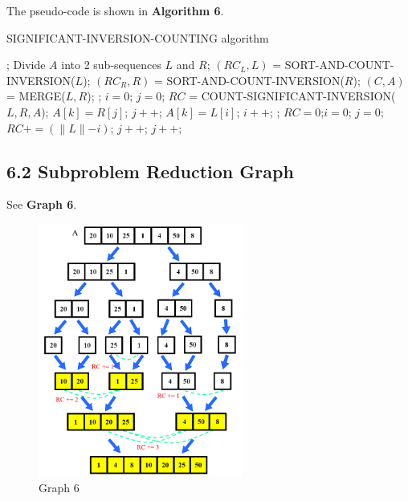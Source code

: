 \documentclass[UTF8]{ctexart}
\begin{document}
The pseudo-code is shown in \textbf{Algorithm 6}.
\begin{algorithm}[htbp]
	\caption{SIGNIFICANT-INVERSION-COUNTING algorithm}
	\begin{algorithmic}[1]
			\State \Return{};
		\EndIf
		\State Divide $A$ into 2 sub-sequences $L$ and $R$;
		\State $(RC_L, L)$ = SORT-AND-COUNT-INVERSION($L$);
		\State $(RC_R, R)$ = SORT-AND-COUNT-INVERSION($R$);
		\State $(C, A)$ = MERGE($L, R$);
		\State {};
	\EndFunction
	\State $i = 0$; $j = 0$;
	\State $RC$ = COUNT-SIGNIFICANT-INVERSION($L, R, A$);
			\State $A[k] = R[j]$;
			\State $j++$;
		\Else
			\State $A[k] = L[i]$;
			\State $i++$;
		\EndIf
	\EndFor
	\State {};
	\EndFunction
		\State $RC = 0$;$i = 0$; $j = 0$;
			\State $RC += (\parallel L \parallel - i)$;
			\State $j ++$;
			\Else
				\State $j++$;
			\EndIf
		\EndWhile
	\EndFunction
	
	\end{algorithmic}
\end{algorithm}

\subsection*{6.2 Subproblem Reduction Graph} 
See \textbf{Graph 6}.
\begin{figure} [htb]
	\centering
	\caption*{Graph 6}
	\includegraphics[width=0.6\textwidth]{figs/6.png}
\end{figure}
\end{document}
